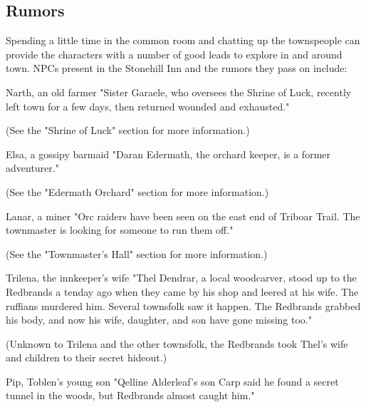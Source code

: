 \documentclass[10pt,a4paper,twoside,bg=print,twocolumn,openany,nodeprecatedcode]{dndbook}
\begin{document}
\subsection{Rumors}
Spending a little time in the common room and chatting up the townspeople can provide the characters with a number of good leads to explore in and around town. NPCs present in the Stonehill Inn and the rumors they pass on include:

\begin{DndSidebar}[float=!b]{Narth, an old farmer}
"Sister Garaele, who oversees the Shrine of Luck, recently left town for a few days, then returned wounded and exhausted."



\end{DndSidebar}

(See the "Shrine of Luck" section for more information.)

\begin{DndSidebar}[float=!b]{Elsa, a gossipy barmaid}
"Daran Edermath, the orchard keeper, is a former adventurer."



\end{DndSidebar}

(See the "Edermath Orchard" section for more information.)

\begin{DndSidebar}[float=!b]{Lanar, a miner}
"Orc raiders have been seen on the east end of Triboar Trail. The townmaster is looking for someone to run them off."



\end{DndSidebar}

(See the "Townmaster's Hall" section for more information.)

\begin{DndSidebar}[float=!b]{Trilena, the innkeeper's wife}
"Thel Dendrar, a local woodcarver, stood up to the Redbrands a tenday ago when they came by his shop and leered at his wife. The ruffians murdered him. Several townsfolk saw it happen. The Redbrands grabbed his body, and now his wife, daughter, and son have gone missing too."



\end{DndSidebar}

(Unknown to Trilena and the other townsfolk, the Redbrands took Thel's wife and children to their secret hideout.)

\begin{DndSidebar}[float=!b]{Pip, Toblen's young son}
"Qelline Alderleaf's son Carp said he found a secret tunnel in the woods, but Redbrands almost caught him."



\end{DndSidebar}
\end{document}
